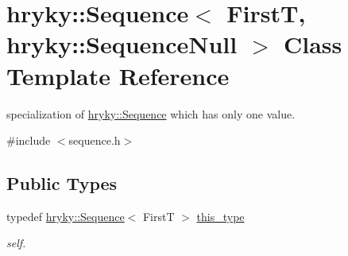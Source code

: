 \hypertarget{classhryky_1_1_sequence_3_01_first_t_00_01hryky_1_1_sequence_null_01_4}{\section{hryky\-:\-:Sequence$<$ First\-T, hryky\-:\-:Sequence\-Null $>$ Class Template Reference}
\label{classhryky_1_1_sequence_3_01_first_t_00_01hryky_1_1_sequence_null_01_4}
}


specialization of \hyperlink{classhryky_1_1_sequence}{hryky\-::\-Sequence} which has only one value.  




{\ttfamily \#include $<$sequence.\-h$>$}

\subsection*{Public Types}
\begin{DoxyCompactItemize}
\item 
\hypertarget{classhryky_1_1_sequence_3_01_first_t_00_01hryky_1_1_sequence_null_01_4_aae0c70f291f926dcc1b8c0905e40f360}{typedef \hyperlink{classhryky_1_1_sequence}{hryky\-::\-Sequence}$<$ First\-T $>$ \hyperlink{classhryky_1_1_sequence_3_01_first_t_00_01hryky_1_1_sequence_null_01_4_aae0c70f291f926dcc1b8c0905e40f360}{this\-\_\-type}}\label{classhryky_1_1_sequence_3_01_first_t_00_01hryky_1_1_sequence_null_01_4_aae0c70f291f926dcc1b8c0905e40f360}

\begin{DoxyCompactList}\small\item\em self. \end{DoxyCompactList}\end{DoxyCompactItemize}
